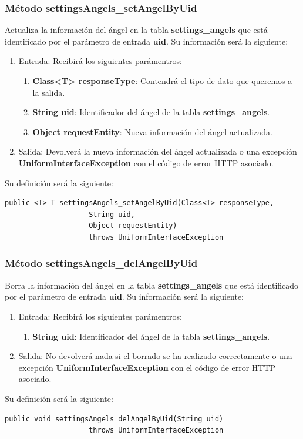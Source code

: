 \subsubsection{Método settingsAngels\_setAngelByUid}
Actualiza la información del ángel en la tabla \textbf{settings\_angels} que está identificado por el parámetro de entrada \textbf{uid}. Su información será la siguiente:
\begin{enumerate}
\item Entrada: Recibirá los siguientes parámentros:
\begin{enumerate}
\item \textbf{Class<T> responseType}: Contendrá el tipo de dato que queremos a la salida. 
\item \textbf{String uid}: Identificador del ángel de la tabla \textbf{settings\_angels}.
\item \textbf{Object requestEntity}: Nueva información del ángel actualizada.
\end{enumerate}
\item Salida: Devolverá la nueva información del ángel actualizada o una excepción \textbf{UniformInterfaceException} con el código de error HTTP asociado.
\end{enumerate}
\bigskip
\par
Su definición será la siguiente:
\begin{verbatim}public <T> T settingsAngels_setAngelByUid(Class<T> responseType, 
					String uid, 
					Object requestEntity) 
					throws UniformInterfaceException\end{verbatim}

\subsubsection{Método settingsAngels\_delAngelByUid}
Borra la información del ángel en la tabla \textbf{settings\_angels} que está identificado por el parámetro de entrada \textbf{uid}. Su información será la siguiente:
\begin{enumerate}
\item Entrada: Recibirá los siguientes parámentros:
\begin{enumerate}
\item \textbf{String uid}: Identificador del ángel de la tabla \textbf{settings\_angels}.
\end{enumerate}
\item Salida: No devolverá nada si el borrado se ha realizado correctamente o una excepción \textbf{UniformInterfaceException} con el código de error HTTP asociado.
\end{enumerate}
\bigskip
\par
Su definición será la siguiente:
\begin{verbatim}public void settingsAngels_delAngelByUid(String uid) 
					throws UniformInterfaceException\end{verbatim}

